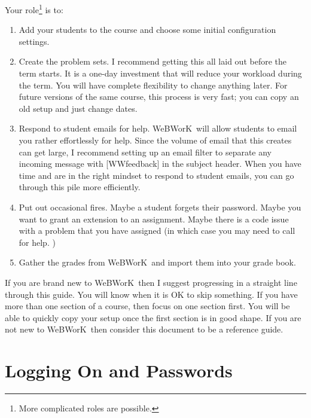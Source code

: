 \documentclass[12pt]{article}
\newcommand{\WW}{WeBWorK}
\begin{document}
Your role\footnote{More complicated roles are possible.
} is to:
\begin{enumerate}
	\item Add your students to the course and choose some initial configuration settings.
	\item Create the problem sets.
	      I recommend getting this all laid out before the term starts.
	      It is a one-day investment that will reduce your workload during the term.
	      You will have complete flexibility to change anything later.
	      For future versions of the same course, this process is very fast; you can copy an old setup and just change dates.
	\item Respond to student emails for help.  \WW\ will allow students to email you rather effortlessly for help.
	      Since the volume of email that this creates can get large, I recommend setting up an email filter to separate any incoming message with [WWfeedback] in the subject header.
	      When you have time and are in the right mindset to respond to student emails, you can go through this pile more efficiently.
	\item Put out occasional fires.
	      Maybe a student forgets their password.
	      Maybe you want to grant an extension to an assignment.
	      Maybe there is a code issue with a problem that you have assigned (in which case you may need to call for help.
	      )
	\item Gather the grades from \WW\ and import them into your grade book.
\end{enumerate}

If you are brand new to \WW\, then I suggest progressing in a straight line through this guide.
You will know when it is OK to skip something.
If you have more than one section of a course, then focus on one section first.
You will be able to quickly copy your setup once the first section is in good shape.
If you are not new to \WW\, then consider this document to be a reference guide.

\section{Logging On and Passwords}
\end{document}
